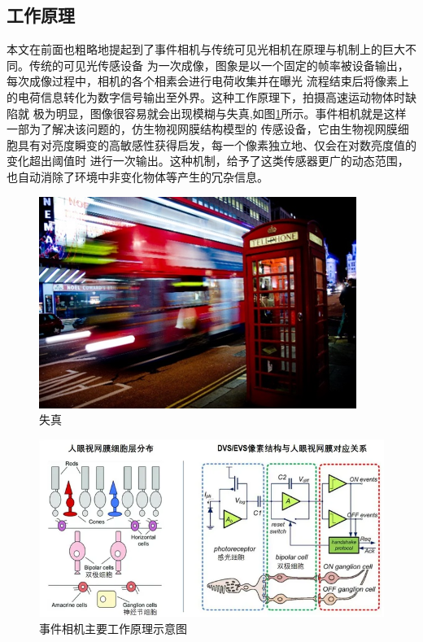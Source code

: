 \subsection{工作原理}
本文在前面也粗略地提起到了事件相机与传统可见光相机在原理与机制上的巨大不同。传统的可见光传感设备
为一次成像，图象是以一个固定的帧率被设备输出，每次成像过程中，相机的各个相素会进行电荷收集并在曝光
流程结束后将像素上的电荷信息转化为数字信号输出至外界。这种工作原理下，拍摄高速运动物体时缺陷就
极为明显，图像很容易就会出现模糊与失真,如图\ref{3}所示。事件相机就是这样一部为了解决该问题的，仿生物视网膜结构模型的
传感设备\cite{tayarani2021event}，它由生物视网膜细胞具有对亮度瞬变的高敏感性获得启发，每一个像素独立地、仅会在对数亮度值的变化超出阈值时
进行一次输出。这种机制，给予了这类传感器更广的动态范围，也自动消除了环境中非变化物体等产生的冗杂信息。
\begin{figure}
    \centering
    \includegraphics[width=\textwidth]{figures/motion_blur.png}
    \caption{失真}
    \label{3}
\end{figure}
\begin{figure}
    \centering
    \includegraphics[width=\textwidth]{figures/working_principle.png}
    \caption{事件相机主要工作原理示意图}
    \label{2}
\end{figure}

